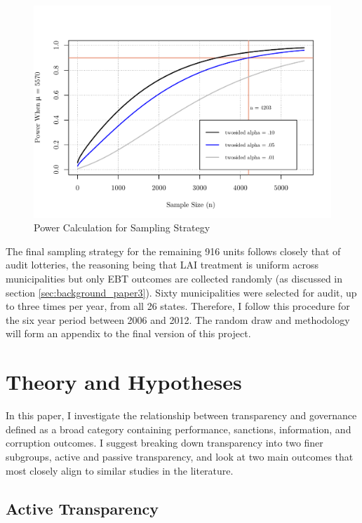 \documentclass[11pt]{article}
\begin{document}
\begin{figure}
\centering
\caption{Power Calculation for Sampling Strategy}
\label{fig:power}
\includegraphics[trim = {0 .5cm 0 2cm}, clip, scale = .75]{power.pdf}
\end{figure}

The final sampling strategy for the remaining 916 units follows closely that of audit lotteries, the reasoning being that LAI treatment is uniform across municipalities but only EBT outcomes are collected randomly (as discussed in section \ref{sec:background_paper3}). Sixty municipalities were selected for audit, up to three times per year, from all 26 states. Therefore, I follow this procedure for the six year period between 2006 and 2012. The random draw and methodology will form an appendix to the final version of this project.

\section{Theory and Hypotheses} \label{sec:theory_paper3}

In this paper, I investigate the relationship between transparency and governance defined as a broad category containing performance, sanctions, information, and corruption outcomes. I suggest breaking down transparency into two finer subgroups, active and passive transparency, and look at two main outcomes that most closely align to similar studies in the literature.

\subsection{Active Transparency} \label{subsec:theory1_paper3}
\end{document}

